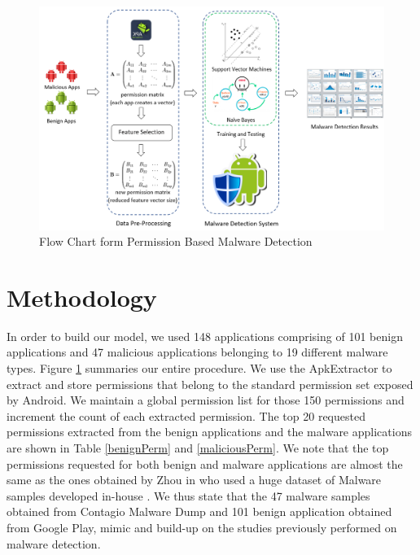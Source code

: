 \begin{figure}[htbp]
\centering
\includegraphics[width=\textwidth]{images/permFlow.png}
\caption{Flow Chart form Permission Based Malware Detection\label{permissioFlow}} 
\end{figure}

\section{Methodology}
In order to build our model, we used 148 applications comprising of 101 benign applications and 47 malicious applications belonging to 19 different malware types. Figure \ref{permissioFlow} summaries our entire procedure. We use the ApkExtractor to extract and store permissions that belong to the standard permission set exposed by Android. We maintain a global permission list for those 150 permissions and increment the count of each extracted permission. The top 20 requested permissions extracted from the benign applications and the malware applications are shown in Table \ref{benignPerm} and \ref{maliciousPerm}. We note that the top permissions requested for both benign and malware applications are almost the same as the ones obtained by Zhou in \cite{zhou2012dissecting} who used a huge dataset of Malware samples developed in-house \cite{Genome}. We thus state that the 47 malware samples obtained from Contagio Malware Dump and 101 benign application obtained from Google Play\cite{PlayStore}, mimic and build-up on the studies previously performed on malware detection.

